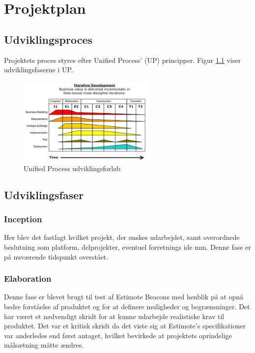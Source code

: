\chapter{Projektplan}
\section{Udviklingsproces}
Projektets proces styres efter Unified Process' (UP) principper. Figur \ref{fig:Unified Process} viser udviklingsfaserne i UP.

\begin{figure}[H]
\centering
\includegraphics[width=0.6\textwidth]{billeder/up-timetable}
\caption{Unified Process udviklingsforløb}
\label{fig:Unified Process}
\end{figure}

\section{Udviklingsfaser}
\subsection{Inception}
Her blev det fastlagt hvilket projekt, der ønskes udarbejdet, samt overordnede beslutning som platform, delprojekter, eventuel forretnings ide mm. Denne fase er på nuværende tidspunkt overstået.

\subsection{Elaboration}
Denne fase er blevet brugt til test af Estimote Beacons med henblik på at opnå bedre forståelse af produktet og for at definere muligheder og begrænsninger. Det har været et nødvendigt skridt for at kunne udarbejde realistiske krav til produktet. Det var et kritisk skridt da det viste sig at Estimote's specifikationer var anderledes end først antaget, hvilket bevirkede at projektets oprindelige målsætning måtte ændres.  \\

